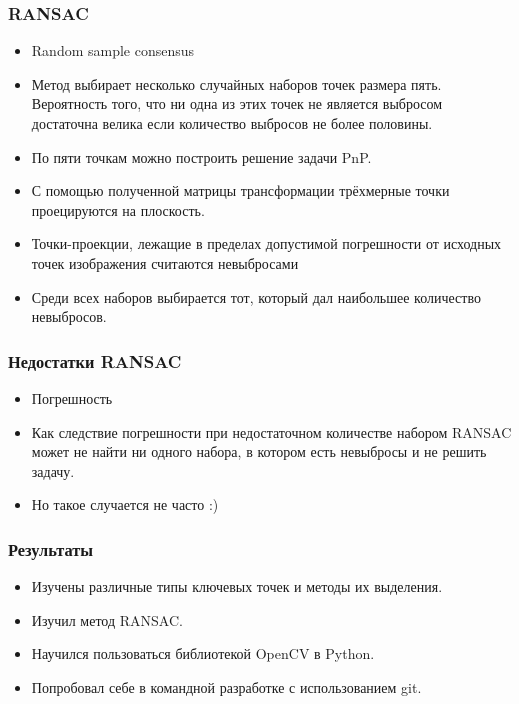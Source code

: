 \begin{frame}\frametitle{RANSAC}
    \begin{itemize}
        \item Random sample consensus
        \item Метод выбирает несколько случайных наборов точек размера пять. 
            Вероятность того, что ни одна из этих точек не является выбросом достаточна велика 
            если количество выбросов не более половины.
        \item По пяти точкам можно построить решение задачи PnP.
        \item С помощью полученной матрицы трансформации трёхмерные точки 
            проецируются на плоскость.
        \item Точки-проекции, лежащие в пределах допустимой погрешности от 
            исходных точек изображения считаются невыбросами
        \item Среди всех наборов выбирается тот, который дал наибольшее 
            количество невыбросов.
    \end{itemize}
\end{frame}
\begin{frame}\frametitle{Недостатки RANSAC}
    \begin{itemize}
        \item Погрешность
        \item Как следствие погрешности при недостаточном количестве набором RANSAC может 
            не найти ни одного набора, в котором есть невыбросы и не решить задачу.
        \item Но такое случается не часто :)
    \end{itemize}
\end{frame}
\begin{frame}\frametitle{Результаты}
    \begin{itemize}
        \item Изучены различные типы ключевых точек и методы их выделения.
        \item Изучил метод RANSAC.
        \item Научился пользоваться библиотекой OpenCV в Python.
        \item Попробовал себе в командной разработке с использованием git.
    \end{itemize}
\end{frame}




